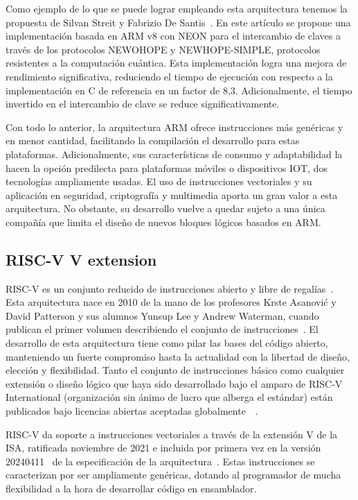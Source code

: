 Como ejemplo de lo que se puede lograr empleando esta arquitectura tenemos la
propuesta de Silvan Streit y Fabrizio De Santis~\cite{armv8-keyExchange}. En
este artículo se propone una implementación basada en ARM v8 con NEON para el
intercambio de claves a través de los protocolos NEWOHOPE y NEWHOPE-SIMPLE,
protocolos resistentes a la computación cuántica. Esta implementación logra una
mejora de rendimiento significativa, reduciendo el tiempo de ejecución con
respecto a la implementación en C de referencia en un factor de 8,3.
Adicionalmente, el tiempo invertido en el intercambio de clave se reduce
significativamente.

Con todo lo anterior, la arquitectura ARM ofrece instrucciones más genéricas y
en menor cantidad, facilitando la compilación el desarrollo para estas
plataformas. Adicionalmente, sus características de consumo y adaptabilidad la
hacen la opción predilecta para plataformas móviles o dispositivos IOT,
dos tecnologías ampliamente usadas. El uso de instrucciones vectoriales y su
aplicación en seguridad, criptografía y multimedia aporta un gran valor a esta arquitectura.
No obstante, su desarrollo vuelve a quedar sujeto a una única compañía que
limita el diseño de nuevos bloques lógicos basados en ARM.

\subsection{RISC-V V extension}

RISC-V es un conjunto reducido de instrucciones abierto y libre de
regalías~\cite{riscV-org}. Esta arquitectura nace en 2010 de la mano de los
profesores Krste Asanović y David Patterson y sus alumnos Yunsup Lee y Andrew
Waterman, cuando publican el primer volumen describiendo el conjunto de
instrucciones~\cite{riscv-2011}. El desarrollo de esta arquitectura tiene como
pilar las bases del código abierto, manteniendo un fuerte compromiso hasta la
actualidad con la libertad de diseño, elección y flexibilidad. Tanto el
conjunto de instrucciones básico como cualquier extensión o diseño lógico que haya sido desarrollado bajo el amparo de RISC-V International (organización sin ánimo de lucro
que alberga el estándar) están publicados bajo licencias abiertas aceptadas
globalmente~\cite{riscV-org}~\cite{asanovic2014instruction}.

RISC-V da soporte a instrucciones vectoriales a través de la extensión V de la
ISA, ratificada noviembre de 2021 e incluida por primera vez en la versión
20240411~\cite{riscv-isa2024} de la especificación de la
arquitectura~\cite{riscv-ratificationEspects}. Estas
instrucciones se caracterizan por ser ampliamente genéricas, dotando al
programador de mucha flexibilidad a la hora de desarrollar código en ensamblador.

